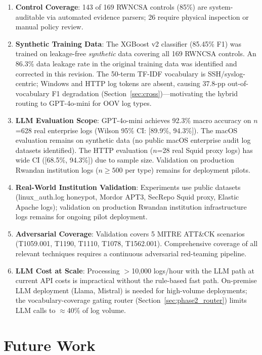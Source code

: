 \documentclass[futureinternet,article,submit,pdftex,moreauthors]{Definitions/mdpi}
\begin{document}
\begin{enumerate}
\item \textbf{Control Coverage}: 143 of 169 RWNCSA controls (85\%) are system-auditable via
automated evidence parsers; 26 require physical inspection or manual policy review.
\item \textbf{Synthetic Training Data}: The XGBoost v2 classifier (85.45\% F1) was trained
on leakage-free \textit{synthetic} data covering all 169 RWNCSA controls. An 86.3\% data
leakage rate in the original training data was identified and corrected in this revision.
The 50-term TF-IDF vocabulary is SSH/syslog-centric; Windows and HTTP log tokens are absent,
causing 37.8-pp out-of-vocabulary F1 degradation (Section~\ref{sec:cross})---motivating the
hybrid routing to GPT-4o-mini for OOV log types.
\item \textbf{LLM Evaluation Scope}: GPT-4o-mini achieves 92.3\% macro accuracy on $n$=628
real enterprise logs (Wilson 95\% CI: [89.9\%, 94.3\%]). The macOS evaluation remains on
synthetic data (no public macOS enterprise audit log datasets identified). The HTTP
evaluation ($n$=28 real Squid proxy logs) has wide CI ([68.5\%, 94.3\%]) due to sample
size. Validation on production Rwandan institution logs ($n \geq 500$ per type) remains
for deployment pilots.
\item \textbf{Real-World Institution Validation}: Experiments use public datasets
(linux\_auth.log honeypot, Mordor APT3, SecRepo Squid proxy, Elastic Apache logs); validation
on production Rwandan institution infrastructure logs remains for ongoing pilot deployment.
\item \textbf{Adversarial Coverage}: Validation covers 5 MITRE ATT\&CK scenarios
(T1059.001, T1190, T1110, T1078, T1562.001). Comprehensive coverage of all relevant
techniques requires a continuous adversarial red-teaming pipeline.
\item \textbf{LLM Cost at Scale}: Processing ${>}$10{,}000 logs/hour with the LLM path at
current API costs is impractical without the rule-based fast path. On-premise LLM deployment
(Llama, Mistral) is needed for high-volume deployments; the vocabulary-coverage gating router
(Section~\ref{sec:phase2_router}) limits LLM calls to $\approx$40\% of log volume.
\end{enumerate}

\section{Future Work}
\label{sec:future_work}
\end{document}
